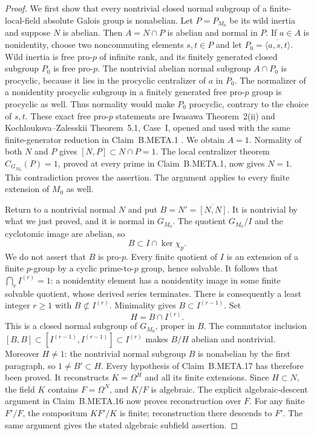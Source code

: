 \begin{proof}
We first show that every nontrivial closed
normal subgroup of a finite-local-field
absolute Galois group is nonabelian.
Let $P=P_{M_0}$ be its wild inertia and
suppose $N$ is abelian.
Then $A=N\cap P$ is abelian and normal in $P$.
If $a\in A$ is nonidentity, choose two
noncommuting elements $s,t\in P$ and let
$P_0=\overline{\langle a,s,t\rangle}$.
Wild inertia is free pro-$p$ of infinite
rank, and its finitely generated closed
subgroup $P_0$ is free pro-$p$.
The nontrivial abelian normal subgroup
$A\cap P_0$ is procyclic, because it lies
in the procyclic centralizer of $a$ in
$P_0$.
The normalizer of a nonidentity procyclic
subgroup in a finitely generated free
pro-$p$ group is procyclic as well.
Thus normality would make $P_0$ procyclic,
contrary to the choice of $s,t$.
These exact free pro-$p$ statements are
Iwasawa Theorem~2(ii) and Kochloukova--Zalesskii
Theorem~5.1, Case~I, opened and used with
the same finite-generator reduction in
Claim~B.META.1
\citep{AN_Iwasawa1955,AN_KZ2011}.
We obtain $A=1$.
Normality of both $N$ and $P$ gives
$[N,P]\subset N\cap P=1$.
The local centralizer theorem
$C_{G_{M_0}}(P)=1$, proved at every prime
in Claim~B.META.1, now gives $N=1$.
This contradiction proves the assertion.
The argument applies to every finite
extension of $M_0$ as well.

Return to a nontrivial normal $N$ and put
$B=N'=\overline{[N,N]}$.
It is nontrivial by what we just proved,
and it is normal in $G_{M_0}$.
The quotient $G_{M_0}/I$ and the cyclotomic
image are abelian, so
\[
                         B\subset I\cap\ker\chi_p.
\]
We do not assert that $B$ is pro-$p$.
Every finite quotient of $I$ is an extension
of a finite $p$-group by a cyclic prime-to-$p$
group, hence solvable.
It follows that $\bigcap_r I^{(r)}=1$:
a nonidentity element has a nonidentity
image in some finite solvable quotient,
whose derived series terminates.
There is consequently a least integer
$r\ge1$ with $B\not\subset I^{(r)}$.
Minimality gives $B\subset I^{(r-1)}$.
Set
\[
                              H=B\cap I^{(r)}.
\]
This is a closed normal subgroup of $G_{M_0}$,
proper in $B$.
The commutator inclusion
$[B,B]\subset [I^{(r-1)},I^{(r-1)}]\subset I^{(r)}$
makes $B/H$ abelian and nontrivial.
Moreover $H\ne1$:
the nontrivial normal subgroup $B$ is
nonabelian by the first paragraph, so
$1\ne B'\subset H$.
Every hypothesis of Claim~B.META.17 has
therefore been proved.
It reconstructs $K=\Omega^H$ and all its
finite extensions.
Since $H\subset N$, the field $K$ contains
$F=\Omega^N$, and $K/F$ is algebraic.
The explicit algebraic-descent argument
in Claim~B.META.16 now proves reconstruction
over $F$.
For any finite $F'/F$, the compositum
$KF'/K$ is finite; reconstruction there
descends to $F'$.
The same argument gives the stated
algebraic subfield assertion.


\end{proof}
